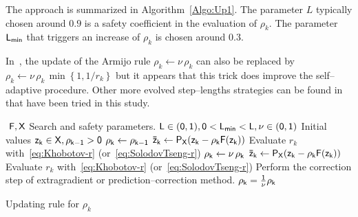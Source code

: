 {The approach is summarized in Algorithm~\ref{Algo:Up1}. The parameter $L$ typically chosen around $0.9$ is a safety coefficient in the evaluation of $\rho_k$. The parameter $\sf L_{min}$ that triggers an increase of $\rho_k$ is chosen around $0.3$.


In~\citep{Han.Lo_CMA2002}, the update of the Armijo rule $\rho_k \leftarrow \nu \,\rho_k$ can also be replaced by  $\rho_k \leftarrow \nu \,\rho_k\, \min\left\{1, 1/r_k\right\}$ but it appears that this trick does improve the self--adaptive procedure. Other more evolved step--lengths strategies can be found in~\citep{Wang_JCAM2010} that have been tried in this study.

\begin{algorithm}
  \begin{algorithmic}
    {\sf
      \STATE $ $
      \REQUIRE $\sf F,X$
      \REQUIRE Search and safety parameters. $\sf L \in (0,1), 0< L_{min} < L, \nu \in (0,1)$
      \REQUIRE Initial values $\sf z_k \in X, \rho_{k-1} >0$
      \STATE $\sf \rho_k \leftarrow \rho_{k-1}$
      \STATE $\sf \bar z_{k} \leftarrow P_X(z_k-\rho_k F(z_k))$
      \STATE Evaluate $r_k$ with~\eqref{eq:Khobotov-r} (or~\eqref{eq:SolodovTseng-r})
      \STATE $\sf \rho_k \leftarrow \nu \,\rho_k$ 
      \STATE $\sf \bar z_{k} \leftarrow P_X(z_k-\rho_k F(z_k))$
      \STATE Evaluate $r_k$ with~\eqref{eq:Khobotov-r} (or~\eqref{eq:SolodovTseng-r})
      \ENDWHILE
      \STATE Perform the correction step of extragradient or prediction--correction method.
      \STATE $\sf \rho_k = \frac 1 \nu \rho_k$ 
      \ENDIF
    }
  \end{algorithmic}
  \caption{Updating rule for $\rho_k$}  \label{Algo:Up1}
\end{algorithm}
}
